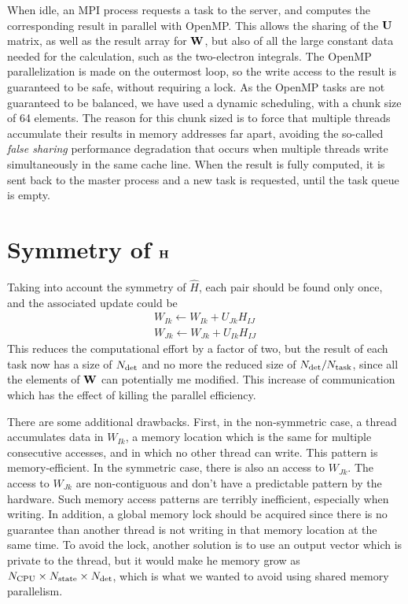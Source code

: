 \documentclass[./thesis.tex]{subfiles}
\begin{document}
When idle, an MPI process requests a task to the server, and computes the
corresponding result in parallel with OpenMP.\cite{openmp} This allows
the sharing of the $\mathbf{U}$ matrix, as well as the result array for $\mathbf{W}$,
but also of all the large constant data needed for the calculation, such as
the two-electron integrals.
The OpenMP parallelization is made on the outermost loop, so the write
access to the result is guaranteed to be safe, without requiring a lock.
As the OpenMP tasks are not guaranteed to be balanced, we have used a
dynamic scheduling, with a chunk size of 64 elements. The reason for this
chunk sized is to force that multiple threads accumulate their results in 
memory addresses far apart, avoiding the so-called \emph{false sharing}
performance degradation that occurs when multiple threads write simultaneously
in the same cache line.\cite{Bolosky1993Sep} 
When the result is fully computed, it is sent back to the master process and
a new task is requested, until the task queue is empty.


\section{Symmetry of $\mathbf{H}$}

Taking into account the symmetry of $\widehat H$, each pair should be found only once, and the associated update could be
\begin{align}
W_{Ik} \gets W_{Ik} + U_{Jk} H_{IJ} \\
W_{Jk} \gets W_{Jk} + U_{Ik} H_{IJ}
\end{align}
This reduces the computational effort by a factor of two, but the result of
each task now has a size of ${N_\text{det}}$ and no more the reduced size of ${N_\text{det}} / N_\text{task}$,
since all the elements of $\mathbf{W}$ can potentially me modified.
This increase of communication which has the effect of killing the parallel
efficiency.

There are some additional drawbacks.
First, in the non-symmetric case, a thread accumulates data in $W_{Ik}$, a memory
location which is the same for multiple consecutive accesses, and in which no other
thread can write. This pattern is memory-efficient.
In the symmetric case, there is also an access to $W_{Jk}$. The access to
$W_{Jk}$ are non-contiguous and don't have a predictable pattern by the hardware.
Such memory access patterns are terribly inefficient, especially when writing.
In addition, a global memory lock should be acquired since there is no
guarantee than another thread is not writing in that memory location at the
same time. To avoid the lock, another solution is to use an output vector which
is private to the thread, but it would make he memory grow as $N_\text{CPU}
\times {N_\text{state}} \times {N_\text{det}}$, which is what
we wanted to avoid using shared memory parallelism.
\end{document}
